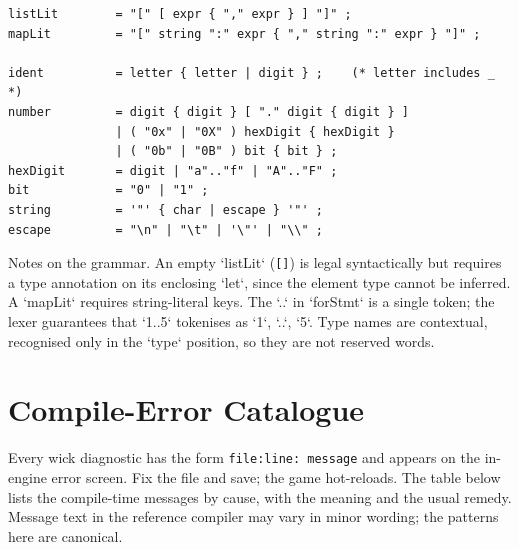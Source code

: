 \begin{lstlisting}[basicstyle=\ttfamily\small,keywordstyle={}]
listLit        = "[" [ expr { "," expr } ] "]" ;
mapLit         = "[" string ":" expr { "," string ":" expr } "]" ;

ident          = letter { letter | digit } ;    (* letter includes _ *)
number         = digit { digit } [ "." digit { digit } ]
               | ( "0x" | "0X" ) hexDigit { hexDigit }
               | ( "0b" | "0B" ) bit { bit } ;
hexDigit       = digit | "a".."f" | "A".."F" ;
bit            = "0" | "1" ;
string         = '"' { char | escape } '"' ;
escape         = "\n" | "\t" | '\"' | "\\" ;
\end{lstlisting}

\noindent
Notes on the grammar. An empty `listLit` (\texttt{[]}) is legal syntactically
but requires a type annotation on its enclosing `let`, since the element type
cannot be inferred. A `mapLit` requires string-literal keys. The `..` in
`forStmt` is a single token; the lexer guarantees that `1..5` tokenises as
`1`, `..`, `5`. Type names are contextual, recognised only in the `type`
position, so they are not reserved words.

\chapter{Compile-Error Catalogue}

Every wick diagnostic has the form \texttt{file:line: message} and appears on
the in-engine error screen. Fix the file and save; the game hot-reloads. The
table below lists the compile-time messages by cause, with the meaning and the
usual remedy. Message text in the reference compiler may vary in minor
wording; the patterns here are canonical.

